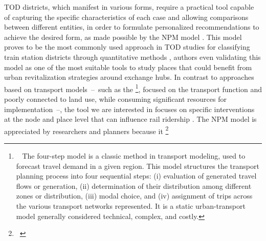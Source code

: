 \begin{refsegment}
\acrshort{TOD} districts, which manifest in various forms, require a practical tool capable of capturing the specific characteristics of each case and allowing comparisons between different entities, in order to formulate personalized recommendations to achieve the desired form, as made possible by the \acrshort{NPM} model \textcolor{blue}{\autocite[270]{li_transit_2019}}. This model proves to be the most commonly used approach in \acrshort{TOD} studies for classifying train station districts through quantitative methods \textcolor{blue}{\autocites[3]{arliani_measuring_2023}[2]{caset_planning_2019}[1]{caset_integrating_2020}[2]{dou_integrating_2021}[113]{ibraeva_transit-oriented_2020}[270]{li_transit_2019}}, authors \textcolor{blue}{\textcite[578]{banerjee_mobility_2022}} even validating this model as one of the most suitable tools to study places that could benefit from urban revitalization strategies around exchange hubs. In contrast to approaches based on transport models~–~such as the \footnote{~
    The four-step model is a classic method in transport modeling, used to forecast travel demand in a given region. This model structures the transport planning process into four sequential steps: (i) evaluation of generated travel flows or generation, (ii) determination of their distribution among different zones or distribution, (iii) modal choice, and (iv) assignment of trips across the various transport networks represented. It is a static urban-transport model generally considered technical, complex, and costly.
}, focused on the transport function and poorly connected to land use, while consuming significant resources for implementation~–, the tool we are interested in focuses on specific interventions at the node and place level that can influence rail ridership \textcolor{blue}{\autocite[2]{caset_integrating_2020}}. The \acrshort{NPM} model is appreciated by researchers and planners because it \footnote{~
}
\end{refsegment}
